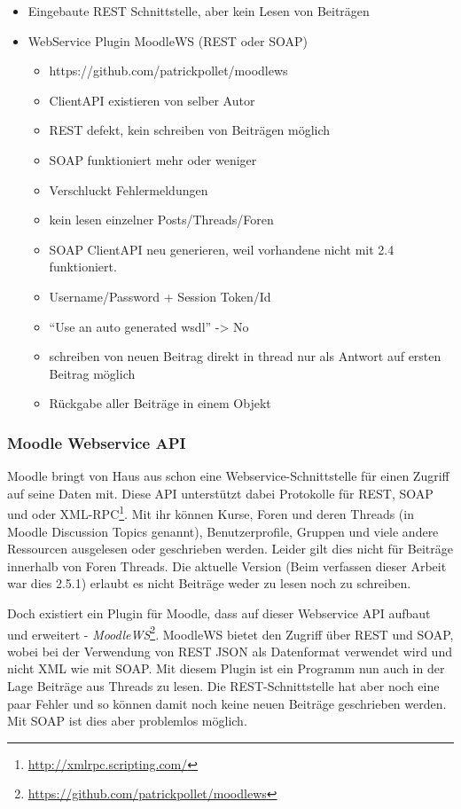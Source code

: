 \begin{itemize}
    \item Eingebaute REST Schnittstelle, aber kein Lesen von Beiträgen
    \item WebService Plugin MoodleWS (REST oder SOAP)
    \begin{itemize}
        \item https://github.com/patrickpollet/moodlews
        \item ClientAPI existieren von selber Autor
        \item REST defekt, kein schreiben von Beiträgen möglich
        \item SOAP funktioniert mehr oder weniger
        \item Verschluckt Fehlermeldungen
        \item kein lesen einzelner Posts/Threads/Foren
        \item SOAP ClientAPI neu generieren, weil vorhandene nicht mit 2.4 funktioniert.
        \item Username/Password + Session Token/Id
        \item “Use an auto generated wsdl” -> No
        \item schreiben von neuen Beitrag direkt in thread nur als Antwort auf ersten Beitrag möglich
        \item Rückgabe aller Beiträge in einem Objekt
    \end{itemize}
\end{itemize}

\subsubsection{Moodle Webservice API} %
\label{ssub:moodle_webservice}

Moodle bringt von Haus aus schon eine Webservice-Schnittstelle für einen Zugriff auf seine Daten mit. Diese API unterstützt dabei Protokolle für REST, SOAP und oder XML-RPC\footnote{\url{http://xmlrpc.scripting.com/}}. Mit ihr können Kurse, Foren und deren Threads (in Moodle Discussion Topics genannt), Benutzerprofile, Gruppen und viele andere Ressourcen ausgelesen oder geschrieben werden. Leider gilt dies nicht für Beiträge innerhalb von Foren Threads. Die aktuelle Version (Beim verfassen dieser Arbeit war dies 2.5.1) erlaubt es nicht Beiträge weder zu lesen noch zu schreiben.

Doch existiert ein Plugin für Moodle, dass auf dieser Webservice API aufbaut und erweitert - \emph{MoodleWS}\footnote{\url{https://github.com/patrickpollet/moodlews}}. MoodleWS bietet den Zugriff über REST und SOAP, wobei bei der Verwendung von REST JSON als Datenformat verwendet wird und nicht XML wie mit SOAP. Mit diesem Plugin ist ein Programm nun auch in der Lage Beiträge aus Threads zu lesen. Die REST-Schnittstelle hat aber noch eine paar Fehler und so können damit noch keine neuen Beiträge geschrieben werden. Mit SOAP ist dies aber problemlos möglich.

